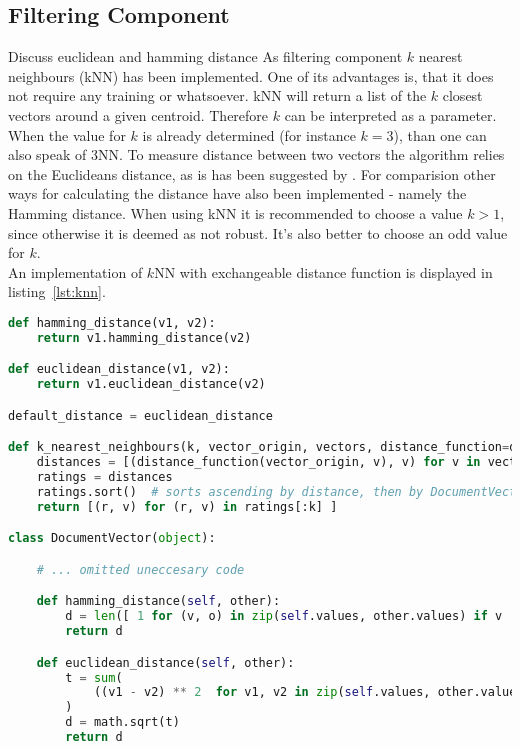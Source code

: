 
\subsection{Filtering Component}
\label{sec:filtering-component}
{\color{red}\tiny Discuss euclidean and hamming distance}
As filtering component $k$ nearest neighbours (kNN) has been implemented.
One of its advantages is, that it does not require any training or whatsoever.\citep[p.~290]{manning:2009}
kNN will return a list of the $k$ closest vectors around a given centroid.
Therefore $k$ can be interpreted as a parameter.
When the value for $k$ is already determined (for instance $k=3$), than one can also speak of 3NN.\citep[p.~297-298]{manning:2009}
To measure distance between two vectors the algorithm relies on the Euclideans distance, as is has been suggested by \citeauthor{manning:2009}.\citep[p.~292]{manning:2009}
For comparision other ways for calculating the distance have also been implemented - namely the Hamming distance.
When using kNN it is recommended to choose a value $k > 1$, since otherwise it is deemed as not robust.
It's also better to choose an odd value for $k$.\\
An implementation of $k$NN with exchangeable distance function is displayed in listing~\ref{lst:knn}.

\begin{lstlisting}[language=Python,caption={kNN and distance methods},label={lst:knn},float=h]
def hamming_distance(v1, v2):
    return v1.hamming_distance(v2)

def euclidean_distance(v1, v2):
    return v1.euclidean_distance(v2)

default_distance = euclidean_distance

def k_nearest_neighbours(k, vector_origin, vectors, distance_function=default_distance):
    distances = [(distance_function(vector_origin, v), v) for v in vectors]
    ratings = distances
    ratings.sort()  # sorts ascending by distance, then by DocumentVector
    return [(r, v) for (r, v) in ratings[:k] ]

class DocumentVector(object):

    # ... omitted uneccesary code

    def hamming_distance(self, other):
        d = len([ 1 for (v, o) in zip(self.values, other.values) if v != o ])
        return d

    def euclidean_distance(self, other):
        t = sum(
            ((v1 - v2) ** 2  for v1, v2 in zip(self.values, other.values))
        )
        d = math.sqrt(t)
        return d
\end{lstlisting}

